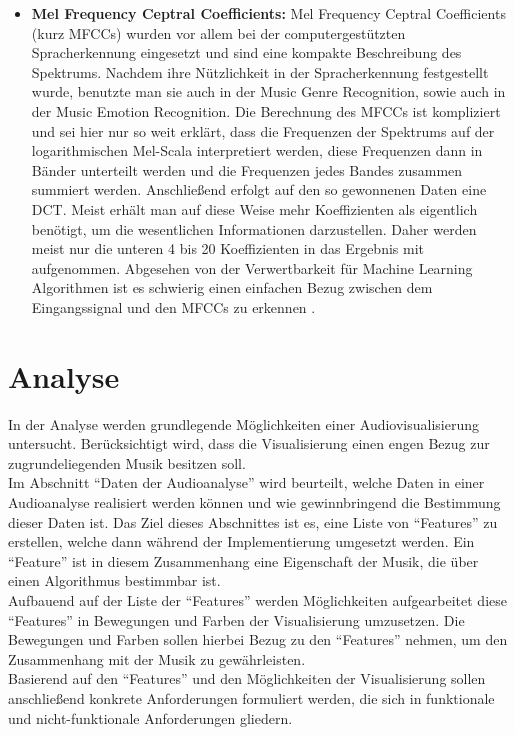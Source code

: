 \documentclass[11pt,a4paper]{article}
\begin{document}
\begin{itemize}
\item \textbf{Mel Frequency Ceptral Coefficients:} Mel Frequency Ceptral Coefficients (kurz MFCCs) wurden vor allem bei der computergestützten Spracherkennung eingesetzt und sind eine kompakte Beschreibung des Spektrums. Nachdem ihre Nützlichkeit in der Spracherkennung festgestellt wurde, benutzte man sie auch in der Music Genre Recognition, sowie auch in der Music Emotion Recognition. Die Berechnung des MFCCs ist kompliziert und sei hier nur so weit erklärt, dass die Frequenzen der Spektrums auf der logarithmischen Mel-Scala interpretiert werden, diese Frequenzen dann in Bänder unterteilt werden und die Frequenzen jedes Bandes zusammen summiert werden. Anschließend erfolgt auf den so gewonnenen Daten eine DCT. Meist erhält man auf diese Weise mehr Koeffizienten als eigentlich benötigt, um die wesentlichen Informationen darzustellen. Daher werden meist nur die unteren 4 bis 20 Koeffizienten in das Ergebnis mit aufgenommen. Abgesehen von der Verwertbarkeit für Machine Learning Algorithmen ist es schwierig einen einfachen Bezug zwischen dem Eingangssignal und den MFCCs zu erkennen \cite[S. 51 ff.]{lerch2012introduction}.
\end{itemize}

\newpage

\section{Analyse}
In der Analyse werden grundlegende Möglichkeiten einer Audiovisualisierung untersucht. Berücksichtigt wird, dass die Visualisierung einen engen Bezug zur zugrundeliegenden Musik besitzen soll.\\
Im Abschnitt ``Daten der Audioanalyse'' wird beurteilt, welche Daten in einer Audioanalyse realisiert werden können und wie gewinnbringend die Bestimmung dieser Daten ist. Das Ziel dieses Abschnittes ist es, eine Liste von ``Features'' zu erstellen, welche dann während der Implementierung umgesetzt werden. Ein ``Feature'' ist in diesem Zusammenhang eine Eigenschaft der Musik, die über einen Algorithmus bestimmbar ist.\\
Aufbauend auf der Liste der ``Features'' werden Möglichkeiten aufgearbeitet diese ``Features'' in Bewegungen und Farben der Visualisierung umzusetzen. Die Bewegungen und Farben sollen hierbei Bezug zu den ``Features'' nehmen, um den Zusammenhang mit der Musik zu gewährleisten.\\
Basierend auf den ``Features'' und den Möglichkeiten der Visualisierung sollen anschließend konkrete Anforderungen formuliert werden, die sich in funktionale und nicht-funktionale Anforderungen gliedern.
\end{document}
